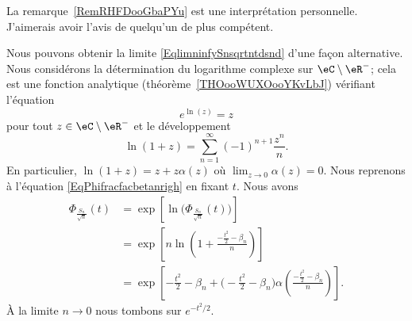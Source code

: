 \begin{probleme}
	La remarque~\ref{RemRHFDooGbaPYu} est une interprétation personnelle. J'aimerais avoir l'avis de quelqu'un de plus compétent.
\end{probleme}


\begin{remark}
	Nous pouvons obtenir la limite \eqref{EqlimninfySnsqrtntdsnd} d'une façon alternative. Nous considérons la détermination du logarithme complexe sur \( \eC\setminus\eR^-\); cela est une fonction analytique (théorème~\ref{THOooWUXOooYKvLbJ}) vérifiant l'équation
	\begin{equation}
		e^{\ln(z)}=z
	\end{equation}
	pour tout \( z\in\eC\setminus\eR^-\) et le développement
	\begin{equation}
		\ln(1+z)=\sum_{n=1}^{\infty}(-1)^{n+1}\frac{ z^n }{ n }.
	\end{equation}
	En particulier, \( \ln(1+z)=z+z\alpha(z)\) où \( \lim_{z\to 0}\alpha(z)=0\). Nous reprenons à l'équation \eqref{EqPhifracfacbetanrigh} en fixant \( t\). Nous avons
	\begin{subequations}
		\begin{align}
			\Phi_{\frac{ S_n }{ \sqrt{n} }}(t) & =\exp\left[ \ln\big(\Phi_{\frac{ S_n }{ \sqrt{n} }}(t)\big) \right]                                                                            \\
			                                   & =\exp\left[ n\ln\left( 1+\frac{ -\frac{ t^2 }{2}-\beta_n }{ n } \right) \right]                                                                \\
			                                   & =\exp\left[ -\frac{ t^2 }{2}-\beta_n+ \big( -\frac{ t^2 }{2}-\beta_n \big)\alpha\left( \frac{ -\frac{ t^2 }{2}-\beta_n }{ n } \right) \right].
		\end{align}
	\end{subequations}
	À la limite \( n\to 0\) nous tombons sur \(  e^{-t^2/2}\).

\end{remark}

